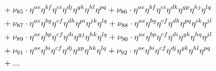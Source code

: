 \documentclass[a4paper,12pt, DIV=14, BCOR=5mm, twoside, headsepline]{scrbook}
\begin{document}
\begin{align}
\begin{alignedat}{2}
& & &\hphantom{=}
+\nu_{85}\cdot\eta^{ae}\eta^{bf}\eta^{ci}\eta^{dj}\eta^{gk}\eta^{hl}\eta^{pq}+\nu_{86}\cdot\eta^{ae}\eta^{bf}\eta^{ci}\eta^{dk}\eta^{gp}\eta^{hj}\eta^{lq}\\
& & &\hphantom{=}
+\nu_{87}\cdot\eta^{ae}\eta^{bg}\eta^{cf}\eta^{dh}\eta^{pi}\eta^{jk}\eta^{lq}+\nu_{88}\cdot\eta^{ae}\eta^{bg}\eta^{cf}\eta^{dh}\eta^{pq}\eta^{ik}\eta^{jl}\\
& & &\hphantom{=}
+\nu_{89}\cdot\eta^{ae}\eta^{bp}\eta^{cf}\eta^{di}\eta^{gj}\eta^{hk}\eta^{lq}+\nu_{90}\cdot\eta^{ae}\eta^{bp}\eta^{cf}\eta^{di}\eta^{gk}\eta^{hq}\eta^{jl}\\
& & &\hphantom{=}
+\nu_{91}\cdot\eta^{ae}\eta^{bi}\eta^{cf}\eta^{dj}\eta^{gp}\eta^{hk}\eta^{lq}+\nu_{92}\cdot\eta^{ae}\eta^{bi}\eta^{cf}\eta^{dj}\eta^{gk}\eta^{hl}\eta^{pq}
\\
& & &\hphantom{=}+ \text{...}
\end{alignedat}
\end{align}
\end{document}
